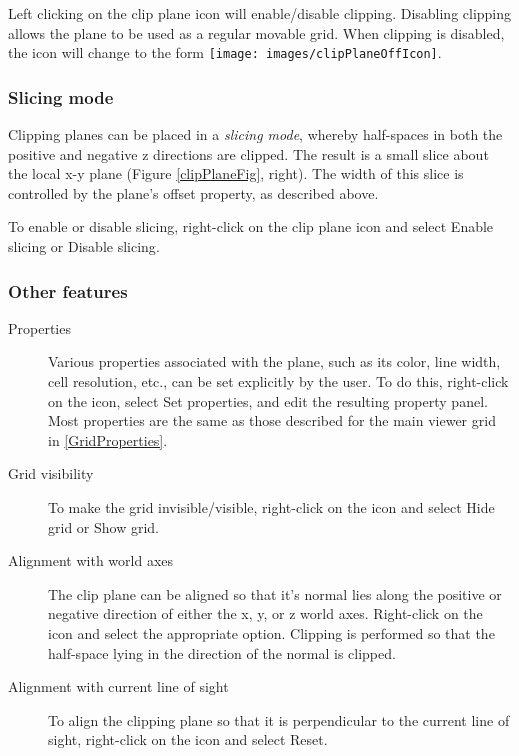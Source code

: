\documentclass{article}
\begin{document}
Left clicking on the clip plane icon will enable/disable
clipping. Disabling clipping allows the plane to be used as a regular
movable grid. When clipping is disabled, the icon
will change to the form
\texttt{[image: images/clipPlaneOffIcon]}.

\subsubsection{Slicing mode}

Clipping planes can be placed in a {\it slicing mode}, whereby half-spaces
in both the positive and negative z directions are clipped. The result
is a small slice about the local x-y plane (Figure \ref{clipPlaneFig},
right). The width of this slice is controlled by the plane's {\sf offset}
property, as described above.

To enable or disable slicing, right-click on the clip plane icon
and select {\sf Enable slicing} or {\sf Disable slicing}.

\subsubsection{Other features}

\begin{description}

\item[Properties]\mbox{}

Various properties associated with the plane, such as its color, line
width, cell resolution, etc., can be set explicitly by the user. To do
this, right-click on the icon, select {\sf Set properties}, and edit
the resulting property panel.  Most properties are the same as those
described for the main viewer grid in \ref{GridProperties}.

\item[Grid visibility]\mbox{}

To make the grid invisible/visible, right-click on the icon
and select {\sf Hide grid} or {\sf Show grid}.

\item[Alignment with world axes]\mbox{}

The clip plane can be aligned so that it's
normal lies along the positive or negative direction of either the x,
y, or z world axes. Right-click on the icon and select the
appropriate option. Clipping is performed so that
the half-space lying in the direction of the normal is clipped.

\item[Alignment with current line of sight]\mbox{}

To align the clipping plane so that it is perpendicular to the
current line of sight, right-click on the icon and select {\sf Reset}.

\end{description}
\end{document}
